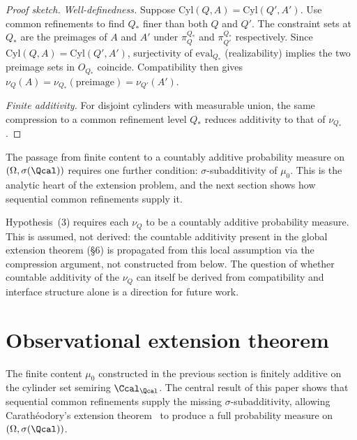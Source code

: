 \begin{proof}[Proof sketch]
\textit{Well-definedness.}
Suppose $\mathrm{Cyl}(Q,A)=\mathrm{Cyl}(Q',A')$.  Use common refinements
to find $Q_*$ finer than both $Q$ and $Q'$.  The constraint sets
at $Q_*$ are the preimages of $A$ and $A'$ under $\pi^{Q_*}_Q$ and
$\pi^{Q_*}_{Q'}$ respectively.  Since $\mathrm{Cyl}(Q,A)=\mathrm{Cyl}(Q',A')$,
surjectivity of $\mathrm{eval}_{Q_*}$ (realizability) implies the two
preimage sets in $O_{Q_*}$ coincide.  Compatibility then gives
$\nu_Q(A)=\nu_{Q_*}(\text{preimage})=\nu_{Q'}(A')$.

\textit{Finite additivity.}
For disjoint cylinders with measurable union, the same compression to
a common refinement level $Q_*$ reduces additivity to that of $\nu_{Q_*}$.
\end{proof}

\begin{remark}
The passage from finite content to a countably additive
probability measure on $(\Omega,\sigma(\Qcal))$ requires one further
condition: $\sigma$-subadditivity of $\mu_0$.  This is the analytic
heart of the extension problem, and the next section shows how
sequential common refinements supply it.

Hypothesis~(3) requires each $\nu_Q$ to be a countably additive
probability measure. This is assumed, not derived: the countable
additivity present in the global extension theorem (\S6) is propagated
from this local assumption via the compression argument, not
constructed from below. The question of whether countable additivity
of the $\nu_Q$ can itself be derived from compatibility and interface
structure alone is a direction for future work.
\end{remark}

\section{Observational extension theorem}

The finite content $\mu_0$ constructed in the previous section is
finitely additive on the cylinder set semiring $\Ccal_{\Qcal}$.
The central result of this paper shows that sequential common refinements
supply the missing $\sigma$-subadditivity, allowing Carathéodory's
extension theorem~\cite{Billingsley,Bogachev} to produce a full probability
measure on $(\Omega,\sigma(\Qcal))$.

